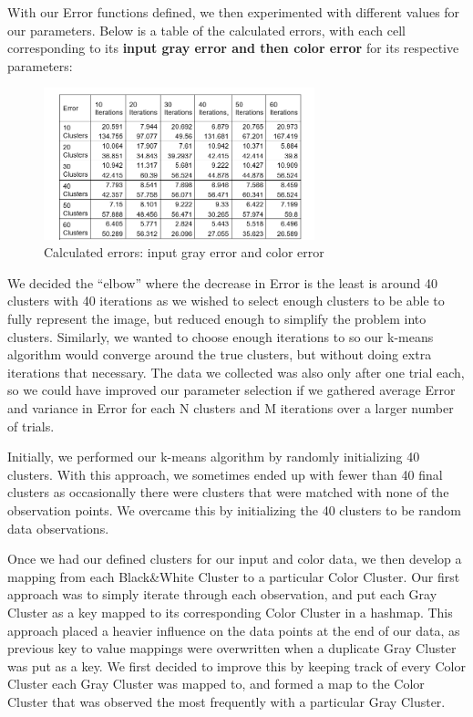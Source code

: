 \documentclass[a4paper]{article}
\begin{document}
\begin{enumerate}
With our Error functions defined, we then experimented with different values for our parameters. Below is a table of the calculated errors, with each cell corresponding to its \textbf{input gray error and then color error} for its respective parameters:

\begin{figure}[h!]
\centering
   \includegraphics[width=0.7\textwidth]{table.png}
\caption{Calculated errors: input gray error and color error}\label{fig}
\end{figure}

We decided the ``elbow'' where the decrease in Error is the least is around 40 clusters with 40 iterations as we wished to select enough clusters to be able to fully represent the image, but reduced enough to simplify the problem into clusters. Similarly, we wanted to choose enough iterations to so our k-means algorithm would converge around the true clusters, but without doing extra iterations that necessary. The data we collected was also only after one trial each, so we could have improved our parameter selection if we gathered average Error and variance in Error for each N clusters and M iterations over a larger number of trials. 

Initially, we performed our k-means algorithm by randomly initializing 40 clusters. With this approach, we sometimes ended up with fewer than 40 final clusters as occasionally there were clusters that were matched with none of the observation points. We overcame this by initializing the 40 clusters to be random data observations.

Once we had our defined clusters for our input and color data, we then develop a mapping from each Black\&White Cluster to a particular Color Cluster. Our first approach was to simply iterate through each observation, and put each Gray Cluster as a key mapped to its corresponding Color Cluster in a hashmap. This approach placed a heavier influence on the data points at the end of our data, as previous key to value mappings were overwritten when a duplicate Gray Cluster was put as a key. We first decided to improve this by keeping track of every Color Cluster each Gray Cluster was mapped to, and formed a map to the Color Cluster that was observed the most frequently with a particular Gray Cluster.


\end{enumerate}
\end{document}

